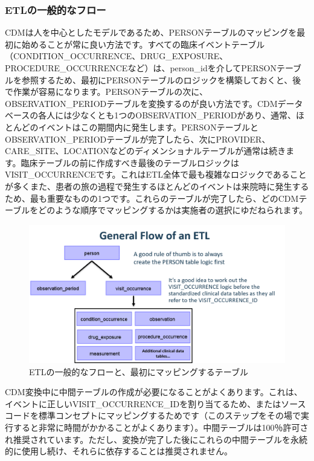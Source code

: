 \documentclass[
  11pt]{book}
\theoremstyle{definition}
\theoremstyle{definition}
\theoremstyle{definition}
\theoremstyle{definition}
\theoremstyle{remark}
\begin{document}
\subsubsection*{ETLの一般的なフロー}\label{etlux306eux4e00ux822cux7684ux306aux30d5ux30edux30fc}

CDMは人を中心としたモデルであるため、PERSONテーブルのマッピングを最初に始めることが常に良い方法です。すべての臨床イベントテーブル（CONDITION\_OCCURRENCE、DRUG\_EXPOSURE、PROCEDURE\_OCCURRENCEなど）は、person\_idを介してPERSONテーブルを参照するため、最初にPERSONテーブルのロジックを構築しておくと、後で作業が容易になります。PERSONテーブルの次に、OBSERVATION\_PERIODテーブルを変換するのが良い方法です。CDMデータベースの各人には少なくとも1つのOBSERVATION\_PERIODがあり、通常、ほとんどのイベントはこの期間内に発生します。PERSONテーブルとOBSERVATION\_PERIODテーブルが完了したら、次にPROVIDER、CARE\_SITE、LOCATIONなどのディメンショナルテーブルが通常は続きます。臨床テーブルの前に作成すべき最後のテーブルロジックはVISIT\_OCCURRENCEです。これはETL全体で最も複雑なロジックであることが多くまた、患者の旅の過程で発生するほとんどのイベントは来院時に発生するため、最も重要なものの1つです。これらのテーブルが完了したら、どのCDMテーブルをどのような順序でマッピングするかは実施者の選択にゆだねられます。

\begin{figure}

{\centering \includegraphics[width=1\linewidth]{images/ExtractTransformLoad/flowOfEtl} 

}

\caption{ETLの一般的なフローと、最初にマッピングするテーブル}\label{fig:etlFlow}
\end{figure}

CDM変換中に中間テーブルの作成が必要になることがよくあります。これは、イベントに正しいVISIT\_OCCURRENCE\_IDを割り当てるため、またはソースコードを標準コンセプトにマッピングするためです（このステップをその場で実行すると非常に時間がかかることがよくあります）。中間テーブルは100％許可され推奨されています。ただし、変換が完了した後にこれらの中間テーブルを永続的に使用し続け、それらに依存することは推奨されません。
\end{document}
